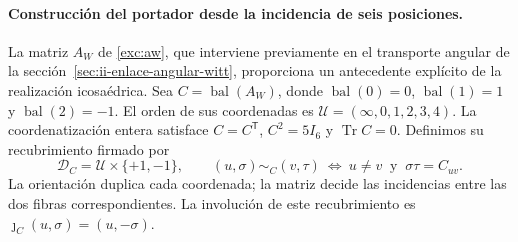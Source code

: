\paragraph{Construcción del portador desde la incidencia de seis posiciones.}
\label{ii:ico:construccion-firmada}
La matriz \(A_W\) de \eqref{exc:aw}, que interviene previamente en el
transporte angular de la sección~\ref{sec:ii-enlace-angular-witt}, proporciona
un antecedente explícito de la realización icosaédrica. Sea
\(C=\operatorname{bal}(A_W)\), donde
\(\operatorname{bal}(0)=0\), \(\operatorname{bal}(1)=1\) y
\(\operatorname{bal}(2)=-1\). El orden de sus coordenadas es
\(\mathcal U=(\infty,0,1,2,3,4)\). La coordenatización entera satisface
\(C=C^{\mathsf T}\), \(C^2=5I_6\) y \(\operatorname{Tr}C=0\).
Definimos su recubrimiento firmado por
\begin{equation}
 \mathcal D_C=\mathcal U\times\{+1,-1\},\qquad
 (u,\sigma)\sim_C(v,\tau)
 \ \Longleftrightarrow\ u\ne v\ \text{ y }\ \sigma\tau=C_{uv}.
 \label{ii:ico:incidencia-firmada}
\end{equation}
La orientación duplica cada coordenada; la matriz decide las incidencias
entre las dos fibras correspondientes. La involución de este recubrimiento
es \(\jmath_C(u,\sigma)=(u,-\sigma)\).

